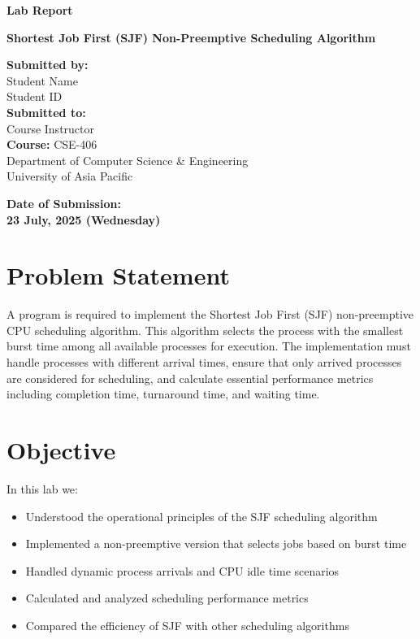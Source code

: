 \documentclass[12pt,a4paper]{article}
\begin{document}
\begin{titlepage}
  \centering

  \vspace*{3cm}

  {\HUGE\bfseries Lab Report}

  \vspace{1cm}

  {\Large\bfseries Shortest Job First (SJF) Non-Preemptive Scheduling Algorithm}

  \vspace{2cm}

  \begin{minipage}{0.6\textwidth}
    \centering
    \Large
    \textbf{Submitted by:} \\[0.5em]
    Student Name \\
    Student ID \\[1em]
    \textbf{Submitted to:} \\[0.5em]
    Course Instructor \\[1em]
    \textbf{Course:} CSE-406 \\[0.5em]
    Department of Computer Science \& Engineering \\
    University of Asia Pacific
  \end{minipage}

  \vfill

  {\Large\bfseries Date of Submission:} \\[0.5em]
  {\LARGE\bfseries 23 July, 2025 (Wednesday)}

  \vspace*{2cm}
\end{titlepage}

\section{Problem Statement}
A program is required to implement the Shortest Job First (SJF) non-preemptive CPU scheduling algorithm. This algorithm selects the process with the smallest burst time among all available processes for execution. The implementation must handle processes with different arrival times, ensure that only arrived processes are considered for scheduling, and calculate essential performance metrics including completion time, turnaround time, and waiting time.

\section{Objective}
In this lab we:
\begin{itemize}
    \item Understood the operational principles of the SJF scheduling algorithm
    \item Implemented a non-preemptive version that selects jobs based on burst time
    \item Handled dynamic process arrivals and CPU idle time scenarios
    \item Calculated and analyzed scheduling performance metrics
    \item Compared the efficiency of SJF with other scheduling algorithms
\end{itemize}
\end{document}
